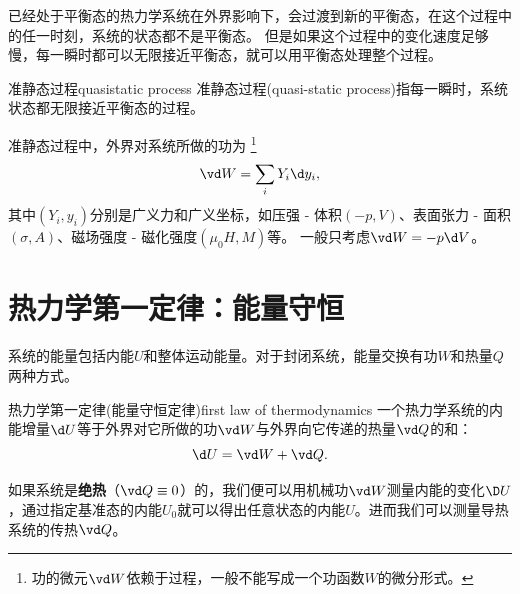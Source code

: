 已经处于平衡态的热力学系统在外界影响下，会过渡到新的平衡态，在这个过程中的任一时刻，系统的状态都不是平衡态。
但是如果这个过程中的变化速度足够慢，每一瞬时都可以无限接近平衡态，就可以用平衡态处理整个过程。

\begin{definition}{准静态过程}{quasistatic process}
	准静态过程(quasi-static process)指每一瞬时，系统状态都无限接近平衡态的过程。
\end{definition}

\begin{corollary}
	准静态过程中，外界对系统所做的功为
	\footnote{功的微元$\vd W$依赖于过程，一般不能写成一个功函数$W$的微分形式。}
	\begin{equation}
		\label{eqn:dW=Ydy}
		\vd W=\sum_iY_i\d y_i,
	\end{equation}
	其中$(Y_i,y_i)$分别是广义力和广义坐标，如压强 - 体积$(-p,V)$、表面张力 - 面积$(\sigma,A)$、磁场强度 - 磁化强度$(\mu_0H,M)$等。
	一般只考虑$\vd W=-p\d V$。
\end{corollary}

\section{热力学第一定律：能量守恒}

系统的能量包括内能$U$和整体运动能量。对于封闭系统，能量交换有功$W$和热量$Q$两种方式。

\begin{theorem}{热力学第一定律(能量守恒定律)}{first law of thermodynamics}
	一个热力学系统的内能增量$\d U$等于外界对它所做的功$\vd W$与外界向它传递的热量$\vd Q$的和：
	\begin{equation}
		\label{eqn:dU=dW+dQ}
		\d U=\vd W+\vd Q.
	\end{equation}
\end{theorem}

\begin{remark}
	如果系统是\textbf{绝热}（$\vd Q\equiv 0$）的，我们便可以用机械功$\vd W$测量内能的变化$\D U$，通过指定基准态的内能$U_0$就可以得出任意状态的内能$U$。进而我们可以测量导热系统的传热$\vd Q$。
\end{remark}


